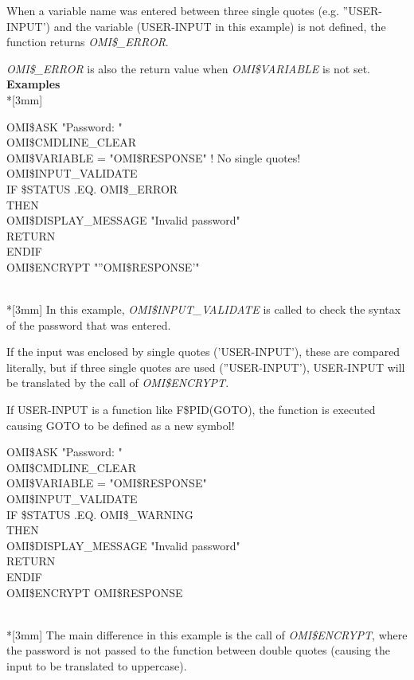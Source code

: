 \documentclass[a4paper]{book}
\renewcommand{\indent}{\hspace*{5mm}}
\begin{document}
When a variable name was entered between three single quotes (e.g. ''USER-INPUT') 
and the variable (USER-INPUT in this example) is not defined, the function 
returns \textsl{OMI{\$}{\_}ERROR}.

\textsl{OMI{\$}{\_}ERROR} is also the return value when \textsl{OMI{\$}VARIABLE} is not set.\\[3mm]
\textbf{Examples}\\*[3mm]
\begin{texttt}
\indent{\$} OMI{\$}ASK "Password: " \\
\indent{\$} OMI{\$}CMDLINE{\_}CLEAR \\
\indent{\$} OMI{\$}VARIABLE = "OMI{\$}RESPONSE" ! No single quotes! \\
\indent{\$} OMI{\$}INPUT{\_}VALIDATE \\
\indent{\$} IF {\$}STATUS .EQ. OMI{\$}{\_}ERROR \\
\indent{\$}   THEN \\
\indent{\$}     OMI{\$}DISPLAY{\_}MESSAGE "Invalid password" \\
\indent{\$}     RETURN \\
\indent{\$} ENDIF \\
\indent{\$} OMI{\$}ENCRYPT "''OMI{\$}RESPONSE'" \\
\end{texttt}\\*[3mm]
In this example, \textsl{OMI{\$}INPUT{\_}VALIDATE} is called to check the syntax of 
the password that was entered.

If the input was enclosed by single quotes ('USER-INPUT'), these are compared 
literally, but if three single quotes are used (''USER-INPUT'), USER-INPUT will be 
translated by the call of \textsl{OMI{\$}ENCRYPT}.

If USER-INPUT is a function like F{\$}PID(GOTO), the function is executed causing 
GOTO to be defined as a new symbol!\\[3mm]
\begin{texttt}
\indent{\$} OMI{\$}ASK "Password: " \\
\indent{\$} OMI{\$}CMDLINE{\_}CLEAR \\
\indent{\$} OMI{\$}VARIABLE = "OMI{\$}RESPONSE" \\
\indent{\$} OMI{\$}INPUT{\_}VALIDATE \\
\indent{\$} IF {\$}STATUS .EQ. OMI{\$}{\_}WARNING \\
\indent{\$}   THEN \\
\indent{\$}     OMI{\$}DISPLAY{\_}MESSAGE "Invalid password" \\
\indent{\$}     RETURN \\
\indent{\$} ENDIF \\
\indent{\$} OMI{\$}ENCRYPT OMI{\$}RESPONSE \\
\end{texttt}\\*[3mm]
The main difference in this example is the call of \textsl{OMI{\$}ENCRYPT}, where the 
password is not passed to the function between double quotes (causing the 
input to be translated to uppercase).
\end{document}

